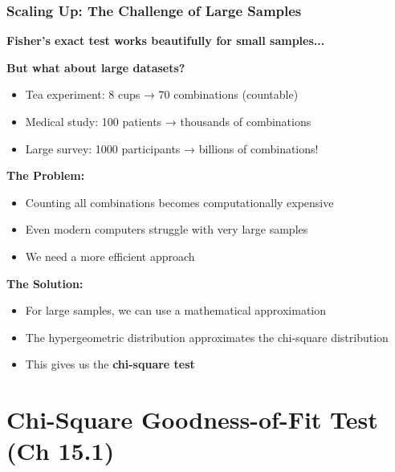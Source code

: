\documentclass{beamer}
\begin{document}
\begin{frame}
\frametitle{Scaling Up: The Challenge of Large Samples}
\textbf{Fisher's exact test works beautifully for small samples...}

\vspace{0.3cm}
\textbf{But what about large datasets?}
\begin{itemize}
\item Tea experiment: 8 cups → 70 combinations (countable)
\item Medical study: 100 patients → thousands of combinations
\item Large survey: 1000 participants → billions of combinations!
\end{itemize}

\vspace{0.3cm}
\textbf{The Problem:}
\begin{itemize}
\item Counting all combinations becomes computationally expensive
\item Even modern computers struggle with very large samples
\item We need a more efficient approach
\end{itemize}

\vspace{0.3cm}
\textbf{The Solution:}
\begin{itemize}
\item For large samples, we can use a mathematical approximation
\item The hypergeometric distribution approximates the chi-square distribution
\item This gives us the \textbf{chi-square test}
\end{itemize}
\end{frame}

\section{Chi-Square Goodness-of-Fit Test (Ch 15.1)}
\end{document}
